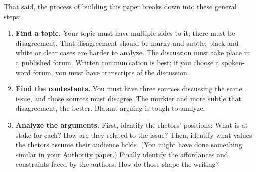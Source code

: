 \documentclass[10pt, twosides]{amsart}	%
\begin{document}
That said, the process of building this paper breaks down into these general steps:
\begin{enumerate}
	\item \textbf{Find a topic.} Your topic must have multiple sides to it; there must be disagreement. That disagreement should be murky and subtle; black-and-white or clear cases are harder to analyze. The discussion must take place in a published forum. Written communication is best; if you choose a spoken-word forum, you must have transcripts of the discussion.
\begin{comment}
While not required, the following ideas might help you find a topic of practical interest:
		\begin{itemize}
			\item Consider politics. No, I'm serious. People never stop talking (or arguing) about political issues, and opinions are rarely a case of right/wrong or yes/no, despite the appearances of our two-party system.
			\item Avoid religion. People never stop talking about this, either, but because religious beliefs are based on assumptions that are fundamental to how people think, it is nearly impossible to focus exclusively on the argument. In other words, don't go there.
			\item Be interested, but not entrenched. The topic should of course be one you want to study in detail, but it should not be one that infuriates you when hearing the opposition. Consider this an exercise in open-mindedness.
			\item Consider current \emph{and past} events. You're welcome to study issues facing your community right now if you want a sense of relevance. You're also free to study historic disagreements if your interests lie there.
			\item Check your major. If you want to make this paper relevant to your degree, ask people in the department you're majoring in for advice. Who are two scholars who argue in writing? What contentious issues can they suggest?
		\end{itemize}%
\end{comment}
	\item \textbf{Find the contestants.} You must have three sources discussing the same issue, and those sources must disagree. The murkier and more subtle that disagreement, the better. Blatant arguing is tough to analyze.
	\item \textbf{Analyze the arguments.} First, identify the rhetors' positions: What is at stake for each? How are they related to the issue? Then, identify what values the rhetors assume their audience holds. (You might have done something similar in your Authority paper.) Finally identify the affordances and constraints faced by the authors. How do those shape the writing?
	

\end{enumerate}
\end{document}

